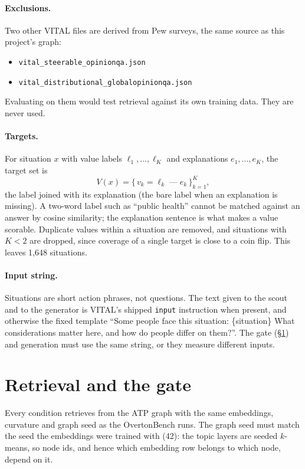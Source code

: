 \documentclass[11pt]{article}
\theoremstyle{definition}
\newcommand{\1}{\mathbf{1}}
\begin{document}
\paragraph{Exclusions.} Two other VITAL files are derived from Pew surveys, the
same source as this project's graph:
\begin{itemize}
  \item \texttt{vital\_steerable\_opinionqa.json}
  \item \texttt{vital\_distributional\_globalopinionqa.json}
\end{itemize}
Evaluating on them would test retrieval against its own training data. They are
never used.

\paragraph{Targets.} For situation $x$ with value labels $\ell_1,\dots,\ell_K$ and
explanations $e_1,\dots,e_K$, the target set is
\[
  V(x) = \{\, v_k = \ell_k \mathbin{\text{---}} e_k \,\}_{k=1}^{K},
\]
the label joined with its explanation (the bare label when an explanation is
missing). A two-word label such as ``public health'' cannot be matched against an
answer by cosine similarity; the explanation sentence is what makes a value
scorable. Duplicate values within a situation are removed, and situations with
$K < 2$ are dropped, since coverage of a single target is close to a coin flip.
This leaves 1{,}648 situations.

\paragraph{Input string.} Situations are short action phrases, not questions. The
text given to the scout and to the generator is VITAL's shipped \texttt{input}
instruction when present, and otherwise the fixed template ``Some people face this
situation: \{situation\} What considerations matter here, and how do people differ
on them?''. The gate (\S\ref{sec:gate}) and generation must use the same string,
or they measure different inputs.

\section{Retrieval and the gate}\label{sec:gate}

Every condition retrieves from the ATP graph with the same embeddings, curvature
and graph seed as the OvertonBench runs. The graph seed must match the seed the
embeddings were trained with (42): the topic layers are seeded $k$-means, so
node ids, and hence which embedding row belongs to which node, depend on it.
\end{document}

